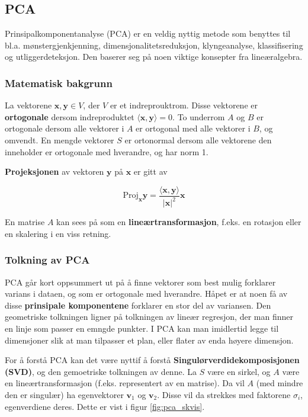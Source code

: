 \subsection{PCA}
Prinsipalkomponentanalyse (PCA) er en veldig nyttig metode som benyttes til bl.a. mønstergjenkjenning, dimensjonalitetsreduksjon, klyngeanalyse, klassifisering og utliggerdeteksjon. Den baserer seg på noen viktige konsepter fra lineæralgebra.

\subsubsection{Matematisk bakgrunn}

La vektorene $\mathbf{x}, \mathbf{y} \in V$, der $V$ er et indreprouktrom. Disse vektorene er \textbf{ortogonale} dersom indreproduktet $\langle \mathbf{x}, \mathbf{y} \rangle = 0$. To underrom $A$ og $B$ er ortogonale dersom alle vektorer i $A$ er ortogonal med alle vektorer i $B$, og omvendt. En mengde vektorer $S$ er ortonormal dersom alle vektorene den inneholder er ortogonale med hverandre, og har norm 1.

\textbf{Projeksjonen} av vektoren $\mathbf{y}$ på $\mathbf{x}$ er gitt av

\begin{equation}
\textrm{Proj}_{\mathbf{x}} \mathbf{y} = \frac{\langle \mathbf{x}, \mathbf{y} \rangle}{|\mathbf{x}|^2}\mathbf{x}
	\label{eq_projection}
\end{equation}

En matrise $A$ kan sees på som en \textbf{lineærtransformasjon}, f.eks. en rotasjon eller en skalering i en viss retning.

\subsubsection{Tolkning av PCA}
PCA går kort oppsummert ut på å finne vektorer som best mulig forklarer varians i dataen, og som er ortogonale med hverandre. Håpet er at noen få av disse \textbf{prinsipale komponentene} forklarer en stor del av variansen. Den geometriske tolkningen ligner på tolkningen av lineær regresjon, der man finner en linje som passer en emngde punkter. I PCA kan man imidlertid legge til dimensjoner slik at man tilpasser et plan, eller flater av enda høyere dimensjon. 

For å forstå PCA kan det være nyttif å forstå \textbf{Singulørverdidekomposisjonen (SVD)}, og den gemoetriske tolkningen av denne. La $S$ være en sirkel, og $A$ være en lineærtransformasjon (f.eks. representert av en matrise). Da vil $A$ (med mindre den er singulær) ha egenvektorer $\mathbf{v}_1$ og $\mathbf{v}_2$. Disse vil da strekkes med faktorene $\sigma_i$, egenverdiene deres. Dette er vist i figur \ref{fig:pca_skvis}.

